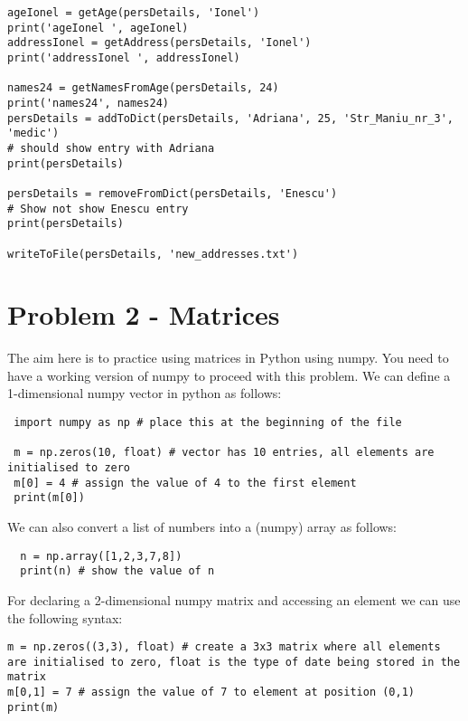 \documentclass[11pt,a4paper]{report}
\begin{document}
\begin{enumerate}
\begin{lstlisting}
ageIonel = getAge(persDetails, 'Ionel')
print('ageIonel ', ageIonel)
addressIonel = getAddress(persDetails, 'Ionel')
print('addressIonel ', addressIonel)

names24 = getNamesFromAge(persDetails, 24)
print('names24', names24)
persDetails = addToDict(persDetails, 'Adriana', 25, 'Str_Maniu_nr_3', 'medic')
# should show entry with Adriana
print(persDetails)

persDetails = removeFromDict(persDetails, 'Enescu')
# Show not show Enescu entry
print(persDetails)

writeToFile(persDetails, 'new_addresses.txt')

\end{lstlisting}

  
\end{enumerate}

\section*{Problem 2 - Matrices}

The aim here is to practice using matrices in Python using numpy. You need to have a working version of numpy to proceed with this problem. We can define a 1-dimensional numpy vector in python as follows:

\begin{lstlisting}
 import numpy as np # place this at the beginning of the file
 
 m = np.zeros(10, float) # vector has 10 entries, all elements are initialised to zero
 m[0] = 4 # assign the value of 4 to the first element
 print(m[0])
\end{lstlisting}

We can also convert a list of numbers into a (numpy) array as follows:

\begin{lstlisting}
  n = np.array([1,2,3,7,8])
  print(n) # show the value of n
\end{lstlisting}

For declaring a 2-dimensional numpy matrix and accessing an element we can use the following syntax:

\begin{lstlisting}
m = np.zeros((3,3), float) # create a 3x3 matrix where all elements are initialised to zero, float is the type of date being stored in the matrix
m[0,1] = 7 # assign the value of 7 to element at position (0,1)
print(m)
\end{lstlisting}
\end{document}
